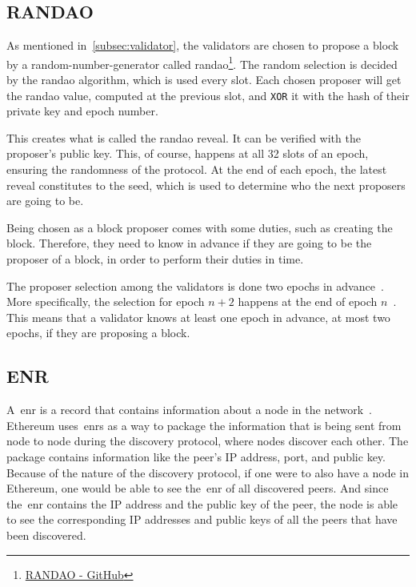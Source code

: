 \subsection{RANDAO}\label{subsec:randao}
As mentioned in~\autoref{subsec:validator}, the validators are chosen to propose a block by a random-number-generator called \gls{randao}\footnote{\href{https://github.com/randao/randao}{RANDAO - GitHub}}.
The random selection is decided by the \gls{randao} algorithm, which is used every slot.
Each chosen proposer will get the \gls{randao} value, computed at the previous slot, and \texttt{XOR} it with the hash of their private key and epoch number.


This creates what is called the \gls{randao} reveal.
It can be verified with the proposer's public key.
This, of course, happens at all 32 slots of an epoch, ensuring the randomness of the protocol.
At the end of each epoch, the latest reveal constitutes to the seed, which is used to determine who the next proposers are going to be.


Being chosen as a block proposer comes with some duties, such as creating the block.
Therefore, they need to know in advance if they are going to be the proposer of a block, in order to perform their duties in time.

The proposer selection among the validators is done two epochs in advance~\cite{random-selection}.
More specifically, the selection for epoch $n+2$ happens at the end of epoch $n$~\cite{upgrading-ethereum-randomness}.
This means that a validator knows at least one epoch in advance, at most two epochs, if they are proposing a block.


\subsection{ENR}\label{subsec:enr}
A~\gls{enr} is a record that contains information about a node in the network~\cite{EIP-778:Ethereum-Node-Records}.
Ethereum uses~\glspl{enr} as a way
to package the information that is being sent from node to node during the discovery protocol,
where nodes discover each other.
The package contains information like the peer's IP address, port, and public key.
Because of the nature of the discovery protocol, if one were to also have a node in Ethereum,
one would be able to see the~\gls{enr} of all discovered peers.
And since the~\gls{enr} contains the IP address and the public key of the peer,
the node is able
to see the corresponding IP addresses and public keys of all the peers that have been discovered.



